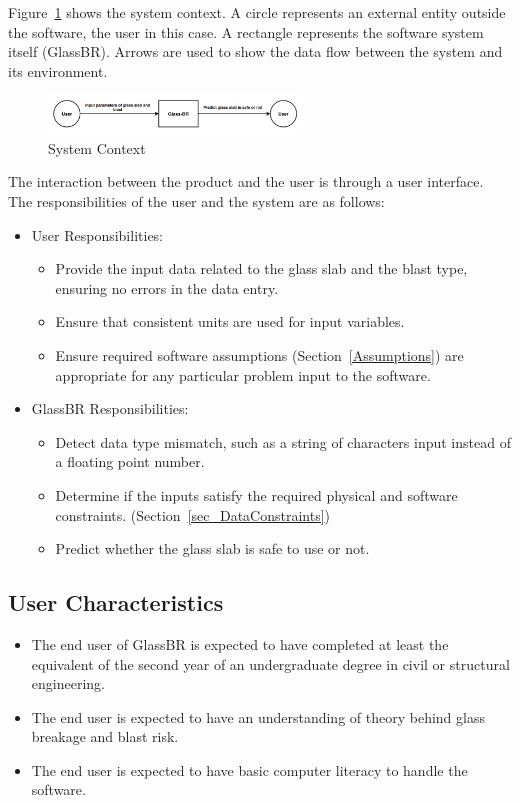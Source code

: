 \documentclass[12pt]{article}
\newcommand{\progname}{GlassBR}
\begin{document}
Figure~\ref{Fig_SystemContext} shows the system context.  A circle represents an
external entity outside the software, the user in this case.  A rectangle
represents the software system itself (\progname{}).  Arrows are used to show the data
flow between the system and its environment.

\begin{figure}[h!]
	\begin{center}
		\includegraphics[width=0.6\textwidth]{SystemContextFigure.PNG}
		\caption{System Context}
		\label{Fig_SystemContext} 
	\end{center}
\end{figure}

The interaction between the product and the user is through a user
interface.  The responsibilities of the user and the system are as follows:

\begin{itemize}
\item User Responsibilities:
  \begin{itemize}
  \item Provide the input data related to the glass slab and the blast type,
    ensuring no errors in the data entry.
  \item Ensure that consistent units are used for input variables.
  \item Ensure required software assumptions (Section~\ref{Assumptions}) are
    appropriate for any particular problem input to the software.
  \end{itemize}
\item \progname{} Responsibilities:
  \begin{itemize}
  \item Detect data type mismatch, such as a string of characters input instead
    of a floating point number.
  \item  Determine if the inputs satisfy the required physical and software
  constraints. (Section~\ref{sec_DataConstraints})
  \item Predict whether the glass slab is safe to use or not.
  \end{itemize}
\end{itemize}

\subsection{User Characteristics} 
\label{sec_userchar}
\begin{itemize}
	\item The end user of \progname{} is expected to have completed at least the
	equivalent of the second year of an undergraduate degree in civil or
	structural engineering.
	\item The end user is expected to have an understanding of theory behind glass
	breakage and blast risk.
	\item The end user is expected to have basic computer literacy to handle the
	software.
\end{itemize}
\end{document}
